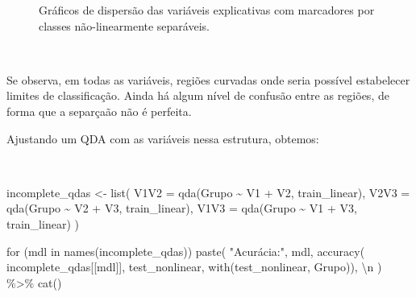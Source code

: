 \documentclass[
  a4paperpaper,
]{article}
\newenvironment{Shaded}{\begin{snugshade}}{\end{snugshade}}
\newcommand{\AttributeTok}[1]{\textcolor[rgb]{0.40,0.45,0.13}{#1}}
\newcommand{\ControlFlowTok}[1]{\textcolor[rgb]{0.00,0.23,0.31}{#1}}
\newcommand{\FunctionTok}[1]{\textcolor[rgb]{0.28,0.35,0.67}{#1}}
\newcommand{\NormalTok}[1]{\textcolor[rgb]{0.00,0.23,0.31}{#1}}
\newcommand{\OtherTok}[1]{\textcolor[rgb]{0.00,0.23,0.31}{#1}}
\newcommand{\SpecialCharTok}[1]{\textcolor[rgb]{0.37,0.37,0.37}{#1}}
\newcommand{\StringTok}[1]{\textcolor[rgb]{0.13,0.47,0.30}{#1}}
\begin{document}
\begin{figure}[H]


\caption{\label{fig-nonlinear}Gráficos de dispersão das variáveis
explicativas com marcadores por classes não-linearmente separáveis.}

\end{figure}%

~

Se observa, em todas as variáveis, regiões curvadas onde seria possível
estabelecer limites de classificação. Ainda há algum nível de confusão
entre as regiões, de forma que a separçaão não é perfeita.

Ajustando um QDA com as variáveis nessa estrutura, obtemos:

~

\begin{Shaded}
\begin{Highlighting}[]
\NormalTok{incomplete\_qdas }\OtherTok{\textless{}{-}} \FunctionTok{list}\NormalTok{(}
  \AttributeTok{V1V2 =} \FunctionTok{qda}\NormalTok{(Grupo }\SpecialCharTok{\textasciitilde{}}\NormalTok{ V1 }\SpecialCharTok{+}\NormalTok{ V2, train\_linear),}
  \AttributeTok{V2V3 =} \FunctionTok{qda}\NormalTok{(Grupo }\SpecialCharTok{\textasciitilde{}}\NormalTok{ V2 }\SpecialCharTok{+}\NormalTok{ V3, train\_linear),}
  \AttributeTok{V1V3 =} \FunctionTok{qda}\NormalTok{(Grupo }\SpecialCharTok{\textasciitilde{}}\NormalTok{ V1 }\SpecialCharTok{+}\NormalTok{ V3, train\_linear)}
\NormalTok{)}

\ControlFlowTok{for}\NormalTok{ (mdl }\ControlFlowTok{in} \FunctionTok{names}\NormalTok{(incomplete\_qdas)) }\FunctionTok{paste}\NormalTok{(}
  \StringTok{"Acurácia:"}\NormalTok{, mdl, }\FunctionTok{accuracy}\NormalTok{(}
\NormalTok{    incomplete\_qdas[[mdl]],}
\NormalTok{    test\_nonlinear,}
    \FunctionTok{with}\NormalTok{(test\_nonlinear, Grupo)), }\StringTok{\textquotesingle{}}\SpecialCharTok{\textbackslash{}n}\StringTok{\textquotesingle{}}
\NormalTok{) }\SpecialCharTok{\%\textgreater{}\%}
  \FunctionTok{cat}\NormalTok{()}
\end{Highlighting}
\end{Shaded}
\end{document}
